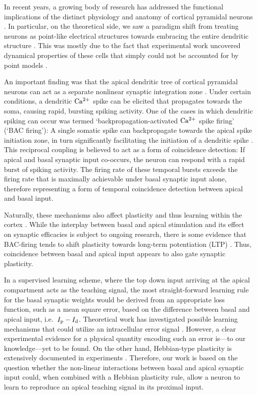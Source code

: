 \documentclass[utf8]{frontiersSCNS} %
\begin{document}
In recent years, a growing body of research has addressed the 
functional implications of the distinct physiology and anatomy of 
cortical pyramidal neurons \cite{Spruston2008,Hay2011,Ramaswamy2015}. 
In particular, on the theoretical side,
we saw a paradigm shift from treating neurons as point-like electrical
structures towards embracing the entire dendritic structure 
\cite{Larkum2009,Poirazi2009,Shai2015}. This was 
mostly due to the fact that experimental work uncovered dynamical properties
of these cells that simply could not be accounted for by point models
\cite{Spruston1995,Hausser2000}.

An important finding was that the apical dendritic tree of
cortical pyramidal neurons can act as a separate nonlinear synaptic 
integration zone \cite{Spruston2008,Branco2011}. 
Under certain conditions, a dendritic $\rm Ca^{2+}$ spike
can be elicited that propagates towards the soma, causing rapid, bursting
spiking activity. One of the cases in which dendritic spiking can occur
was termed `backpropagation-activated $\rm Ca^{2+}$ spike firing' 
(`BAC firing'): A single somatic spike can backpropagate towards the apical
spike initiation zone, in turn significantly facilitating the initiation of 
a dendritic spike \cite{Stuart2001,Spruston2008,Larkum2013}. 
This reciprocal coupling is believed to act as a form of
coincidence detection: If apical and basal synaptic input co-occurs, the 
neuron can respond with a rapid burst of spiking activity. 
The firing rate of these temporal bursts exceeds the firing 
rate that is maximally achievable under basal synaptic input alone, 
therefore representing a form of temporal coincidence
detection between apical and basal input.

Naturally, these mechanisms also affect plasticity and thus learning
within the cortex \cite{Sjoestroem2006,Ebner2019}. 
While the interplay between basal and apical stimulation and
its effect on synaptic efficacies is subject to ongoing research, 
there is some evidence that BAC-firing tends to shift plasticity 
towards long-term potentiation (LTP) \cite{Letzkus2006}. 
Thus, coincidence between basal and apical input appears 
to also gate synaptic plasticity.

In a supervised learning scheme, where the top down input
arriving at the apical compartment acts as the teaching signal,
the most straight-forward learning rule for the basal synaptic
weights would be derived from an appropriate loss function,
such as a mean square error, based on the difference between 
basal and apical input, i.e.\ $I_{\rm p} - I_{\rm d}$. Theoretical work has 
investigated possible learning mechanisms
that could utilize an intracellular error signal
\citep{Urbanczik2014,Schiess2016,Guerguiev2017}.
However, a clear experimental
evidence for a physical quantity encoding such an error 
is---to our knowledge---yet to be found. 
On the other hand, Hebbian-type plasticity is extensively
documented in experiments 
\cite{Gustafsson1987,Debanne1994,Markram1997,Bi1998}. 
Therefore, our work is based on the question whether the 
non-linear interactions between basal and apical synaptic input could, 
when combined with a Hebbian plasticity rule, allow a neuron
to learn to reproduce an apical teaching signal in its
proximal input.
\end{document}

